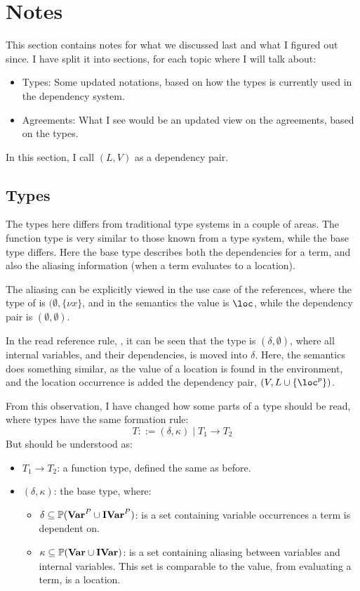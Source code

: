 \documentclass[../../master.tex]{subfiles}
\begin{document}
\section{Notes}
This section contains notes for what we discussed last and what I figured out since.
I have split it into sections, for each topic where I will talk about:
\begin{itemize}
	\item Types: Some updated notations, based on how the types is currently used in the dependency system.
	\item Agreements: What I see would be an updated view on the agreements, based on the types.
\end{itemize}

In this section, I call $(L,V)$ as a dependency pair.

\subsection{Types}
The types here differs from traditional type systems in a couple of areas.
The function type is very similar to those known from a type system, while the base type differs.
Here the base type describes both the dependencies for a term, and also the aliasing information (when a term evaluates to a location).

The aliasing can be explicitly viewed in the use case of the references, where the type of  is $(\emptyset,\{\nu x\}$, and in the semantics the value is $\loc$, while the dependency pair is $(\emptyset,\emptyset)$.

In the read reference rule, , it can be seen that the type is $(\delta,\emptyset)$, where all internal variables, and their dependencies, is moved into $\delta$.
Here, the semantics does something similar, as the value of a location is found in the environment, and the location occurrence is added the dependency pair, $(V,L\cup\{\loc^p\})$.

From this observation, I have changed how some parts of a type should be read, where types have the same formation rule:
$$T::= (\delta,\kappa)\mid T_1\rightarrow T_2$$
But should be understood as:
\begin{itemize}
	\item $T_1\rightarrow T_2$: a function type, defined the same as before.
	\item $(\delta,\kappa)$: the base type, where:
	\begin{itemize}
		\item $\delta\subseteq\mathbb{P}(\textbf{Var}^P\cup\textbf{IVar}^P)$: is a set containing variable occurrences a term is dependent on.
		\item $\kappa\subseteq\mathbb{P}(\textbf{Var}\cup\textbf{IVar})$: is a set containing aliasing between variables and internal variables.
			This set is comparable to the value, from evaluating a term, is a location.
	\end{itemize}
\end{itemize}
\end{document}
